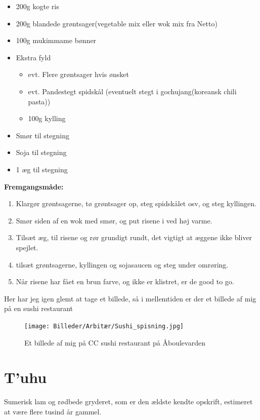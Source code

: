 \documentclass{book}
\begin{document}
\begin{minipage}[t]{0.5\textwidth}
\begin{itemize}
    \item 200g kogte ris
    \item 200g blandede grøntsager(vegetable mix eller wok mix fra Netto)
    \item 100g mukimmame bønner
    \item Ekstra fyld
     \begin{itemize}
        \item evt. Flere grøntsager hvis ønsket
        \item evt. Pandestegt spidskål (eventuelt stegt i gochujang(koreansk chili pasta))
        \item 100g kylling
    \end{itemize}
    \item Smør til stegning
    \item Soja til stegning
    \item 1 æg til stegning
\end{itemize}
\end{minipage}
\begin{minipage}[t]{0.5\textwidth}
\textbf{Fremgangsmåde:}
\begin{enumerate}
    \item Klargør grøntsagerne, tø grøntsager op, steg spidskålet osv, og steg kyllingen.
    \item Smør siden af en wok med smør, og put risene i ved høj varme.
    \item Tilsæt æg, til risene og rør grundigt rundt, det vigtigt at æggene ikke bliver spejlet.
    \item tilsæt grøntsagerne, kyllingen og sojasaucen og steg under omrøring.
    \item Når risene har fået en brun farve, og ikke er klistret, er de good to go.
\end{enumerate}
\end{minipage}
\newpage   Her har jeg igen glemt at tage et billede, så i mellemtiden er der et billede af mig på en sushi restaurant  \begin{figure}
    \centering
    \texttt{[image: Billeder/Arbitær/Sushi\_spisning.jpg]}
    \caption{Et billede af mig på CC sushi restaurant  på Åboulevarden}
\end{figure}
\newpage \section{T'uhu}
Sumerisk lam og rødbede gryderet, som er den ældste kendte opskrift, estimeret at være flere tusind år gammel. 
\end{document}
